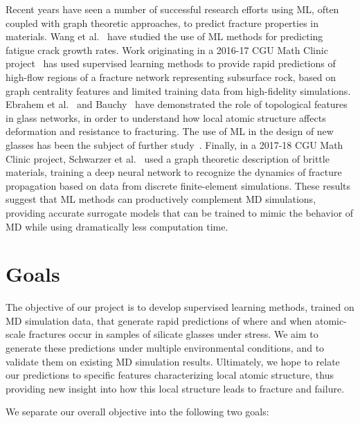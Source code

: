 Recent years have seen a number of successful research efforts using ML, often coupled with graph theoretic approaches, to predict fracture properties in materials. Wang et al.~\cite{MLACrack} have studied the use of ML methods for predicting fatigue crack growth rates. Work originating in a 2016-17 CGU Math Clinic project~\cite{valera2018machine,TopSystem} has used supervised learning methods to provide rapid predictions of high-flow regions of a fracture network representing subsurface rock, based on graph centrality features and limited training data from high-fidelity simulations.  Ebrahem et al.~\cite{ebrahem2018influence} and Bauchy~\cite{bauchy} have demonstrated the role of topological features in glass networks, in order to understand how local atomic structure affects deformation and resistance to fracturing.  The use of ML in the design of new glasses has been the subject of further study~\cite{liu2019machine}.  Finally, in a 2017-18 CGU Math Clinic project, Schwarzer et al.~\cite{schwarzer2019learning,mudunuru2019} used a graph theoretic description of brittle materials, training a deep neural network to recognize the dynamics of fracture propagation based on data from discrete finite-element simulations.  These results suggest that ML methods can productively complement MD simulations, providing accurate surrogate models that can be trained to mimic the behavior of MD while using dramatically less computation time.


\section{Goals}
The objective of our project is to develop supervised learning methods, trained on MD simulation data, that generate rapid predictions of where and when atomic-scale fractures occur in samples of silicate glasses under stress.  We aim to generate these predictions under multiple environmental conditions, and to validate them on existing MD simulation results.  Ultimately, we hope to relate our predictions to specific features characterizing local atomic structure, thus providing new insight into how this local structure leads to fracture and failure.

We separate our overall objective into the following two goals:

